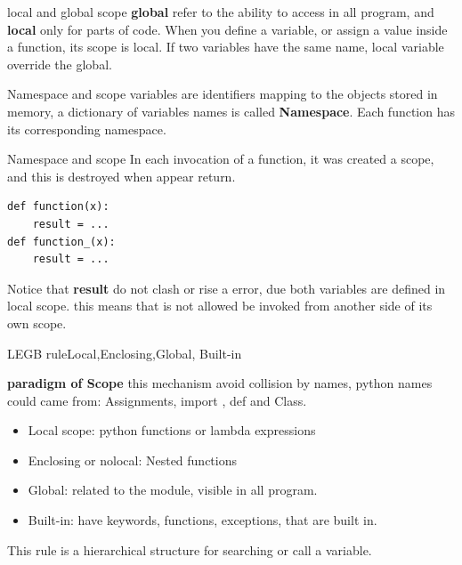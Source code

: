 \documentclass{beamer}
\begin{document}
\begin{frame}{local and global scope}
\textbf{global} refer to the ability to access in all program, and \textbf{local} only for parts of code.
When you define a variable, or assign a value inside a function, its scope is local.
If two variables have the same name, local variable override the global.

\end{frame}

\begin{frame}[fragile]{Namespace and scope}
variables are identifiers mapping to the objects stored in memory, a dictionary of variables names is called \textbf{Namespace}. Each function has its corresponding namespace.

\end{frame}





\begin{frame}[fragile]{Namespace and scope}
In each invocation of a function, it was created a scope, and this is destroyed when appear return.
\begin{lstlisting}
def function(x):
	result = ...
def function_(x):
	result = ...
\end{lstlisting}
Notice that \textbf{result} do not clash or rise a error, due both variables are defined in local scope. this means that is not allowed be invoked from another side of its own scope.
\end{frame}




\begin{frame}{LEGB rule}{Local,Enclosing,Global, Built-in}

\textbf{paradigm of Scope} this mechanism avoid collision by names,
python names could came from: Assignments, import , def and Class.

\begin{itemize}
\item Local scope: python functions or lambda expressions
\item Enclosing or nolocal: Nested functions
\item Global: related to the module, visible in all program.
\item Built-in: have keywords, functions, exceptions, that are built in.
\end{itemize}
This rule is a hierarchical structure for searching or call a variable.

\end{frame}
\end{document}
